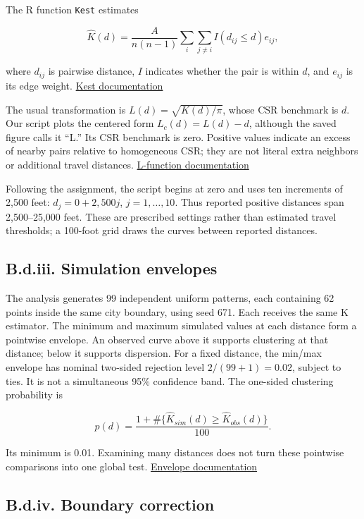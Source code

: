 \documentclass[
  10pt,
]{article}
\begin{document}
The R function \texttt{Kest} estimates

\[
\widehat K(d)=\frac{A}{n(n-1)}
\sum_i\sum_{j\ne i}I(d_{ij}\le d)e_{ij},
\]

where \(d_{ij}\) is pairwise distance, \(I\) indicates whether the pair
is within \(d\), and \(e_{ij}\) is its edge weight.
\href{https://search.r-project.org/CRAN/refmans/spatstat.explore/html/Kest.html}{Kest
documentation}

The usual transformation is \(L(d)=\sqrt{K(d)/\pi}\), whose CSR
benchmark is \(d\). Our script plots the centered form
\(L_c(d)=L(d)-d\), although the saved figure calls it ``L.'' Its CSR
benchmark is zero. Positive values indicate an excess of nearby pairs
relative to homogeneous CSR; they are not literal extra neighbors or
additional travel distances.
\href{https://search.r-project.org/CRAN/refmans/spatstat.explore/html/Lest.html}{L-function
documentation}

Following the assignment, the script begins at zero and uses ten
increments of 2,500 feet: \(d_j=0+2,500j\), \(j=1,\ldots,10\). Thus
reported positive distances span 2,500--25,000 feet. These are
prescribed settings rather than estimated travel thresholds; a 100-foot
grid draws the curves between reported distances.

\subsection{B.d.iii. Simulation
envelopes}\label{b.d.iii.-simulation-envelopes}

The analysis generates 99 independent uniform patterns, each containing
62 points inside the same city boundary, using seed 671. Each receives
the same K estimator. The minimum and maximum simulated values at each
distance form a pointwise envelope. An observed curve above it supports
clustering at that distance; below it supports dispersion. For a fixed
distance, the min/max envelope has nominal two-sided rejection level
\(2/(99+1)=0.02\), subject to ties. It is not a simultaneous 95\%
confidence band. The one-sided clustering probability is

\[
p(d)=\frac{1+\#\{\widehat K_{sim}(d)\ge\widehat K_{obs}(d)\}}{100}.
\]

Its minimum is 0.01. Examining many distances does not turn these
pointwise comparisons into one global test.
\href{https://search.r-project.org/CRAN/refmans/spatstat.explore/help/envelope.html}{Envelope
documentation}

\subsection{B.d.iv. Boundary
correction}\label{b.d.iv.-boundary-correction}
\end{document}
